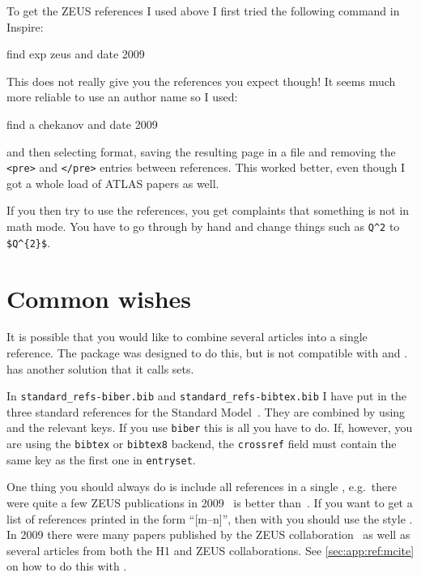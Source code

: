 To get the ZEUS references I used above I first tried the following
command in Inspire:
\begin{bashlisting}
find exp zeus and date 2009
\end{bashlisting}
\noindent This does not really give you the references you expect though! It
seems much more reliable to use an author name so I used:
\begin{bashlisting}
find a chekanov and date 2009
\end{bashlisting}
\noindent and then selecting \BibTeX{} format, saving the resulting page in a file
and removing the \texttt{<pre>} and \texttt{</pre>} entries between
references. This worked better, even though I got a whole load of
ATLAS papers as well.

If you then try to use the references, you get complaints that
something is not in math mode. You have to go through by hand and
change things such as \verb+Q^2+ to \verb+$Q^{2}$+.


\section{Common wishes}%
\label{sec:ref:tips}

It is possible that you would like to combine several articles into a
single reference. The  package was designed to do this,
but is not compatible with  and
.  has another solution that it
calls sets.

In \texttt{standard\_refs-biber.bib} and
\texttt{standard\_refs-bibtex.bib} I have put in the three standard
references for the Standard Model~\cite{gsw}. They are combined by
using  and the relevant keys.
If you use \texttt{biber} this is all you have to do.
If, however, you are using the \texttt{bibtex} or \texttt{bibtex8} backend, 
the \texttt{crossref} field must contain the same key as the first one in
\texttt{entryset}.

One thing you should always do is include all references in a single
, e.g.\ there were quite a few ZEUS publications in
2009~\cite{Chekanov:2009qja,Chekanov:2009zz,Chekanov:2009tu} is better
than~\cite{Chekanov:2009qja}\cite{Chekanov:2009zz}\cite{Chekanov:2009tu}.
If you want to get a list of references printed in the form \enquote{[m--n]},
then with  you should use the style
. In 2009 there were many papers published by the
ZEUS
collaboration~\cite{Chekanov:2009qja,Chekanov:2009zz,Chekanov:2009tu}
as well as several articles from both the H1 and ZEUS
collaborations\cite{Chekanov:2009wt,Aaron:2009wg}.
See \cref{sec:app:ref:mcite} on how to do this with \BibTeX.

